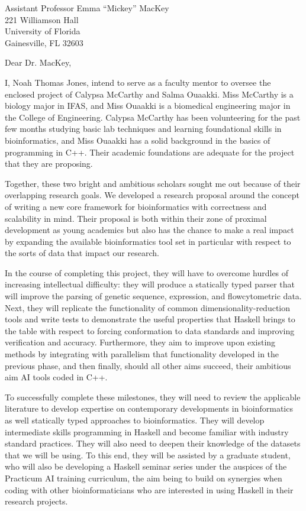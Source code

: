 \documentclass[10pt,letterpaper]{letter}
\begin{document}
\begin{letter}{Assistant Professor Emma ``Mickey'' MacKey \\ 221 Williamson Hall
\\ University of Florida \\ Gainesville, FL 32603}
\opening{Dear Dr. MacKey,}

I, Noah Thomas Jones, intend to serve as a faculty mentor to oversee the enclosed project of Calypsa McCarthy and Salma Ouaakki. Miss McCarthy is a biology major in IFAS, and Miss Ouaakki is a biomedical engineering major in the College of Engineering. Calypsa McCarthy has been volunteering for the past few months studying basic lab techniques and learning foundational skills in bioinformatics, and Miss Ouaakki has a solid background in the basics of programming in C++. Their academic foundations are adequate for the project that they are proposing.

Together, these two bright and ambitious scholars sought me out because of their overlapping research goals. We developed a research proposal around the concept of writing a new core framework for bioinformatics with correctness and scalability in mind. Their proposal is both within their zone of proximal development as young academics but also has the chance to make a real impact by expanding the available bioinformatics tool set in particular with respect to the sorts of data that impact our research.

In the course of completing this project, they will have to overcome hurdles of increasing intellectual difficulty: they will produce a statically typed parser that will improve the parsing of genetic sequence, expression, and flowcytometric data. Next, they will replicate the functionality of common dimensionality-reduction tools and write tests to demonstrate the useful properties that Haskell brings to the table with respect to forcing conformation to data standards and improving verification and accuracy. Furthermore, they aim to improve upon existing methods by integrating with parallelism that functionality developed in the previous phase, and then finally, should all other aims succeed, their ambitious aim AI tools coded in C++.

To successfully complete these milestones, they will need to review the applicable literature to develop expertise on contemporary developments in bioinformatics as well statically typed approaches to bioinformatics. They will develop intermediate skills programming in Haskell and become familiar with industry standard practices. They will also need to deepen their knowledge of the datasets that we will be using. To this end, they will be assisted by a graduate student, who will also be developing a Haskell seminar series under the auspices of the Practicum AI training curriculum, the aim being to build on synergies when coding with other bioinformaticians who are interested in using Haskell in their research projects.


\end{letter}
\end{document}
